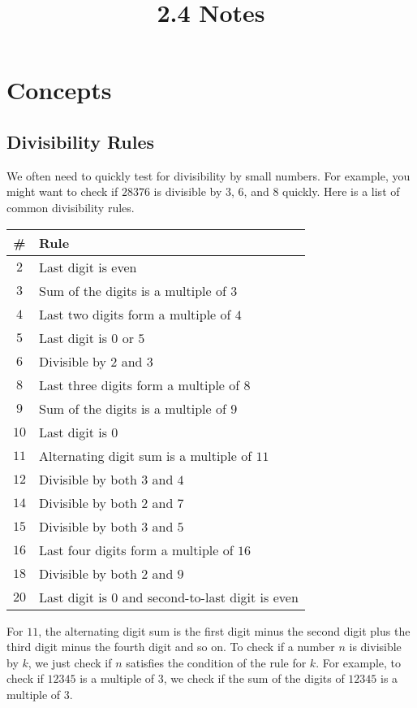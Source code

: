 \documentclass{article}
\title{2.4 Notes}
\author{}
\date{}
\begin{document}
\maketitle

\section*{Concepts}
\begin{multicols}{2}
	
	\subsection*{Divisibility Rules}
	We often need to quickly test for divisibility by small numbers.
	For example, you might want to check if $28376$ is divisible by $3$, $6$, and $8$ quickly.
	Here is a list of common divisibility rules.
	
	\begin{tabular}{|c|l|}
		\hline
		\# & Rule \\
		\hline
		$2$    & Last digit is even \\
		$3$    & Sum of the digits is a multiple of $3$ \\
		$4$    & Last two digits form a multiple of $4$ \\
		$5$    & Last digit is $0$ or $5$ \\
		$6$    & Divisible by $2$ and $3$ \\
		$8$    & Last three digits form a multiple of $8$ \\
		$9$    & Sum of the digits is a multiple of $9$ \\
		$10$   & Last digit is $0$ \\
		$11$   & Alternating digit sum is a multiple of $11$ \\
		$12$   & Divisible by both $3$ and $4$ \\
		$14$   & Divisible by both $2$ and $7$ \\
		$15$   & Divisible by both $3$ and $5$ \\
		$16$   & Last four digits form a multiple of $16$ \\
		$18$   & Divisible by both $2$ and $9$ \\
		$20$   & Last digit is $0$ and second-to-last digit is even \\
		\hline
	\end{tabular}
	
	For $11$, the alternating digit sum is the first digit minus the second digit plus the
	third digit minus the fourth digit and so on.
	To check if a number $n$ is divisible by $k$, we just check if $n$ satisfies the condition
	of the rule for $k$.
	For example, to check if $12345$ is a multiple of $3$,
	we check if the sum of the digits of $12345$ is a multiple of $3$.
	

\end{multicols}
\end{document}
